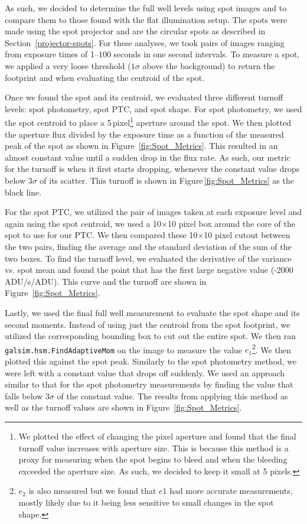 As such, we decided to determine the full well levels using spot images and to compare them to those found with the flat illumination setup. The spots were made using the spot projector and are the circular spots as described in Section~\ref{projector-spots}. For these analyses, we took pairs of images ranging from exposure times of 1--100 seconds in one second intervals. To measure a spot, we applied a very loose threshold ($1\sigma$ above the background) to return the footprint and when evaluating the centroid of the spot.

Once we found the spot and its centroid, we evaluated three different turnoff levels: spot photometry, spot PTC, and spot shape.
For spot photometry, we used the spot centroid to place a 5\,pixel\footnote{We plotted the effect of changing the pixel aperture and found that the final turnoff value increases with aperture size. This is because this method is a proxy for measuring when the spot begins to bleed and when the bleeding exceeded the aperture size. As such, we decided to keep it small at 5 pixels.} aperture around the spot. We then plotted the aperture flux divided by the exposure time as a function of the measured peak of the spot as shown in Figure~\ref{fig:Spot_Metrics}. This resulted in an almost constant value until a sudden drop in the flux rate. As such, our metric for the turnoff is when it first starts dropping, whenever the constant value drops below $3\sigma$ of its scatter. This turnoff is shown in Figure\,\ref{fig:Spot_Metrics} as the black line.

For the spot PTC, we utilized the pair of images taken at each exposure level and again using the spot centroid, we used a 10$\times$10 pixel box around the core of the spot to use for our PTC. We then compared these 10$\times$10 pixel cutout between the two pairs, finding the average and the standard deviation of the sum of the two boxes. To find the turnoff level, we evaluated the derivative of the variance vs. spot mean and found the point that has the first large negative value (-2000 ADU/s/ADU). This curve and the turnoff are shown in Figure~\ref{fig:Spot_Metrics}.

Lastly, we used the final full well measurement to evaluate the spot shape and its second moments. Instead of using just the centroid from the spot footprint, we utilized the corresponding bounding box to cut out the entire spot. We then ran \texttt{galsim.hsm.FindAdaptiveMom} on the image to measure the value $e_1$\footnote{$e_2$ is also measured but we found that $e1$ had more accurate measurements, mostly likely due to it being less sensitive to small changes in the spot shape.}. We then plotted this against the spot peak. Similarly to the spot photometry method, we were left with a constant value that drops off suddenly. We used an approach similar to that for the spot photometry measurements by finding the value that falls below $3\sigma$ of the constant value. The results from applying this method as well as the turnoff values are shown in Figure~\ref{fig:Spot_Metrics}.

